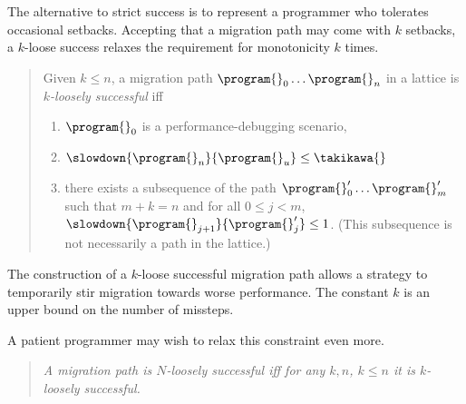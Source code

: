 The alternative to strict success is to represent a programmer who tolerates
occasional setbacks. Accepting that a migration path may come with $k$ setbacks,
a $k$-loose success relaxes the requirement for monotonicity $k$ times.

\begin{quote} \em

Given $k \leq n$, a migration path ${\program{}_0} \ldots {\program{}_n}$ in a
lattice  is \emph{$k$-loosely successful}
iff 
\begin{enumerate}
  \item  $\program{}_0$ is a performance-debugging scenario,
  \item $\slowdown{\program{}_n}{\program{}_u} \leq \takikawa{}$  
  \item there exists a subsequence of the path 
    ${\program{}^\prime_0} \ldots {\program{}^\prime_m}$ such that
     $m + k = n$ and
      for all $0 \leq j < m$,
      $\slowdown{\program{}_{j+1}}{\program{}^\prime_{j}} \leq 1$.
      \subitem (This subsequence is not necessarily a path in the lattice.)
  \end{enumerate} 
\end{quote}
The construction of a $k$-loose successful migration path allows a strategy to
temporarily stir migration towards worse performance. The constant $k$ is an
upper bound on the number of missteps.


A patient programmer may wish to relax this constraint even more.

\begin{quote} \em
A migration path is $N$-loosely successful iff for any $k, n$, $k \leq n$ it is
\emph{$k$-loosely successful}. 
\end{quote}


